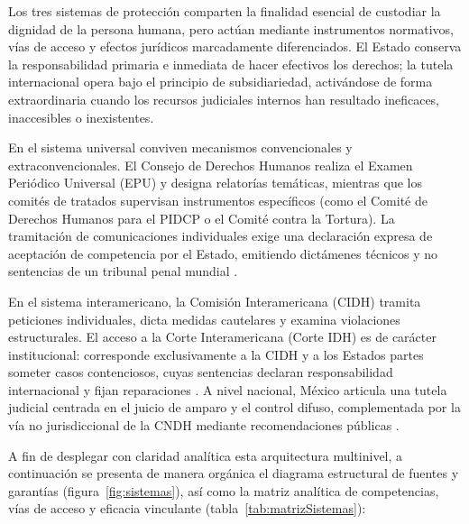 \documentclass[12pt,spanish,letterpaper,oneside]{article}
\begin{document}
Los tres sistemas de protecci\'on comparten la finalidad esencial de custodiar la dignidad de la persona humana, pero act\'uan mediante instrumentos normativos, v\'ias de acceso y efectos jur\'idicos marcadamente diferenciados. El Estado conserva la responsabilidad primaria e inmediata de hacer efectivos los derechos; la tutela internacional opera bajo el principio de subsidiariedad, activ\'andose de forma extraordinaria cuando los recursos judiciales internos han resultado ineficaces, inaccesibles o inexistentes.

En el sistema universal conviven mecanismos convencionales y extraconvencionales. El Consejo de Derechos Humanos realiza el Examen Peri\'odico Universal (EPU) y designa relator\'ias tem\'aticas, mientras que los comit\'es de tratados supervisan instrumentos espec\'ificos (como el Comit\'e de Derechos Humanos para el PIDCP o el Comit\'e contra la Tortura). La tramitaci\'on de comunicaciones individuales exige una declaraci\'on expresa de aceptaci\'on de competencia por el Estado, emitiendo dict\'amenes t\'ecnicos y no sentencias de un tribunal penal mundial \citep{acnudhComunicaciones}.

En el sistema interamericano, la Comisi\'on Interamericana (CIDH) tramita peticiones individuales, dicta medidas cautelares y examina violaciones estructurales. El acceso a la Corte Interamericana (Corte IDH) es de car\'acter institucional: corresponde exclusivamente a la CIDH y a los Estados partes someter casos contenciosos, cuyas sentencias declaran responsabilidad internacional y fijan reparaciones \citep[arts. 44 y 61--68]{oeaPacto1969ADH}. A nivel nacional, M\'exico articula una tutela judicial centrada en el juicio de amparo y el control difuso, complementada por la v\'ia no jurisdiccional de la CNDH mediante recomendaciones p\'ublicas \citep[arts. 102, 103 y 107]{cpeumADH2026}.

A fin de desplegar con claridad anal\'itica esta arquitectura multinivel, a continuaci\'on se presenta de manera org\'anica el diagrama estructural de fuentes y garant\'ias (figura~\ref{fig:sistemas}), as\'i como la matriz anal\'itica de competencias, v\'ias de acceso y eficacia vinculante (tabla~\ref{tab:matrizSistemas}):
\end{document}
